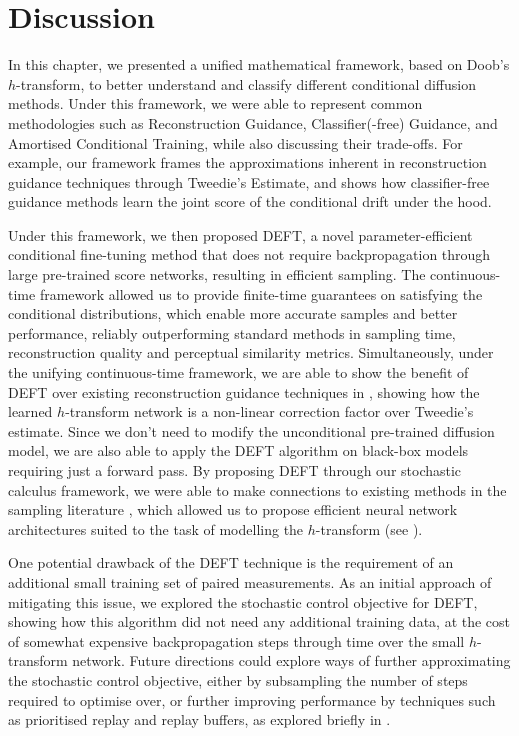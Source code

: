 \section{Discussion}
\label{sec:deft_discussion}

In this chapter, we presented a unified mathematical framework, based on Doob's $h$-transform, to better understand and classify different conditional diffusion methods. Under this framework, we were able to represent common methodologies such as Reconstruction Guidance, Classifier(-free) Guidance, and Amortised Conditional Training, while also discussing their trade-offs. For example, our framework frames the approximations inherent in reconstruction guidance techniques through Tweedie's Estimate, and shows how classifier-free guidance methods learn the joint score of the conditional drift under the hood. 

Under this framework, we then proposed DEFT, a novel parameter-efficient conditional fine-tuning method that does not require backpropagation through large pre-trained score networks, resulting in efficient sampling. The continuous-time framework allowed us to provide finite-time guarantees on satisfying the conditional distributions, which enable more accurate samples and better performance, reliably outperforming standard methods in sampling time, reconstruction quality and perceptual similarity metrics. Simultaneously, under the unifying continuous-time framework, we are able to show the benefit of DEFT over existing reconstruction guidance techniques in , showing how the learned $h$-transform network is a non-linear correction factor over Tweedie's estimate. Since we don't need to modify the unconditional pre-trained diffusion model, we are also able to apply the DEFT algorithm on black-box models requiring just a forward pass. By proposing DEFT through our stochastic calculus framework, we were able to make connections to existing methods in the sampling literature \citep{phillips2024particle,vargas2023denoising,zhang2021path}, which allowed us to propose efficient neural network architectures suited to the task of modelling the $h$-transform (see ).

One potential drawback of the DEFT technique is the requirement of an additional small training set of paired measurements. As an initial approach of mitigating this issue, we explored the stochastic control objective for DEFT, showing how this algorithm did not need any additional training data, at the cost of somewhat expensive backpropagation steps through time over the small $h$-transform network. Future directions could explore ways of further approximating the stochastic control objective, either by subsampling the number of steps required to optimise over, or further improving performance by techniques such as prioritised replay and replay buffers, as explored briefly in \textcite{domingo2024adjoint}. 
